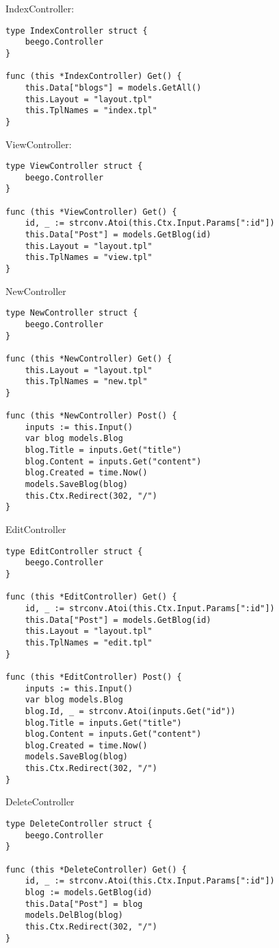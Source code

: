 IndexController:

\begin{lstlisting}[numbers=none]
type IndexController struct {
    beego.Controller
}

func (this *IndexController) Get() {
    this.Data["blogs"] = models.GetAll()
    this.Layout = "layout.tpl"
    this.TplNames = "index.tpl"
}
\end{lstlisting}

ViewController:

\begin{lstlisting}[numbers=none]
type ViewController struct {
    beego.Controller
}

func (this *ViewController) Get() {
    id, _ := strconv.Atoi(this.Ctx.Input.Params[":id"])
    this.Data["Post"] = models.GetBlog(id)
    this.Layout = "layout.tpl"
    this.TplNames = "view.tpl"
}
\end{lstlisting}

NewController

\begin{lstlisting}[numbers=none]
type NewController struct {
    beego.Controller
}

func (this *NewController) Get() {
    this.Layout = "layout.tpl"
    this.TplNames = "new.tpl"
}

func (this *NewController) Post() {
    inputs := this.Input()
    var blog models.Blog
    blog.Title = inputs.Get("title")
    blog.Content = inputs.Get("content")
    blog.Created = time.Now()
    models.SaveBlog(blog)
    this.Ctx.Redirect(302, "/")
}        
\end{lstlisting}

EditController

\begin{lstlisting}[numbers=none]
type EditController struct {
    beego.Controller
}

func (this *EditController) Get() {
    id, _ := strconv.Atoi(this.Ctx.Input.Params[":id"])
    this.Data["Post"] = models.GetBlog(id)
    this.Layout = "layout.tpl"
    this.TplNames = "edit.tpl"
}

func (this *EditController) Post() {
    inputs := this.Input()
    var blog models.Blog
    blog.Id, _ = strconv.Atoi(inputs.Get("id"))
    blog.Title = inputs.Get("title")
    blog.Content = inputs.Get("content")
    blog.Created = time.Now()
    models.SaveBlog(blog)
    this.Ctx.Redirect(302, "/")
}
\end{lstlisting}

DeleteController

\begin{lstlisting}[numbers=none]
type DeleteController struct {
    beego.Controller
}

func (this *DeleteController) Get() {
    id, _ := strconv.Atoi(this.Ctx.Input.Params[":id"])
    blog := models.GetBlog(id)
    this.Data["Post"] = blog
    models.DelBlog(blog)
    this.Ctx.Redirect(302, "/")
}
\end{lstlisting}
